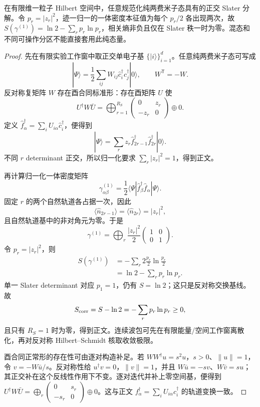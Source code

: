 \begin{theorem}
在有限维一粒子 Hilbert 空间中，任意规范化纯两费米子态具有的正交 Slater 分解。令 $p_r=|z_r|^2$，迹一归一的一体密度本征值为每个 $p_r/2$ 各出现两次，故 $S(\gamma^{(1)})=\ln2-\sum_rp_r\ln p_r$，相关熵非负且仅在 Slater 秩一时为零。混态和不同可操作分区不能直接套用此纯态量。
\end{theorem}
\begin{proof}
先在有限实验工作窗中取正交单电子基 $\{|i\rangle\}_{i=1}^{d}$。任意纯两费米子态可写成
\[
|\Psi\rangle
=\frac12\sum_{ij}W_{ij}\hat c_i^\dagger\hat c_j^\dagger|0\rangle,
\qquad W^{\mathsf T}=-W.
\]
反对称复矩阵 $W$ 存在酉合同标准形：存在酉矩阵 $U$ 使
\[
U^\dagger W\bar U
=\bigoplus_{r=1}^{R_S}
\begin{pmatrix}0&z_r\\-z_r&0\end{pmatrix}\oplus0.
\]
定义 $\hat f_\alpha^\dagger=\sum_iU_{i\alpha}\hat c_i^\dagger$，便得到
\[
|\Psi\rangle
=\sum_rz_r\hat f_{2r-1}^\dagger\hat f_{2r}^\dagger|0\rangle.
\]
不同 $r$ determinant 正交，所以归一化要求 $\sum_r|z_r|^2=1$，得到正文。

再计算归一化一体密度矩阵
\[
\gamma^{(1)}_{\alpha\beta}
=\frac12\langle\Psi|\hat f_\beta^\dagger\hat f_\alpha|\Psi\rangle.
\]
固定 $r$ 的两个自然轨道各占据一次，因此
\[
\langle\hat n_{2r-1}\rangle
=\langle\hat n_{2r}\rangle
=|z_r|^2,
\]
且自然轨道基中的非对角元为零。于是
\[
\gamma^{(1)}
=\bigoplus_r\frac{|z_r|^2}{2}
\begin{pmatrix}1&0\\0&1\end{pmatrix}.
\]
令 $p_r=|z_r|^2$，则
\begin{align*}
S(\gamma^{(1)})
&=-\sum_r2\frac{p_r}{2}\ln\frac{p_r}{2}\\
&=\ln2-\sum_rp_r\ln p_r.
\end{align*}
单一 Slater determinant 对应 $p_1=1$，仍有 $S=\ln2$；这只是反对称交换基线。故
\[
S_{\rm corr}=S-\ln2=-\sum_rp_r\ln p_r\ge0,
\]
且只有 $R_S=1$ 时为零，得到正文。连续波包可先在有限能量/空间工作窗离散化，再对反对称 Hilbert--Schmidt 核取收敛极限。

酉合同正常形的存在性可由逐对构造补足。若 $WW^\dagger u=s^2u$，$s>0$、$\|u\|=1$，令 $v=-W\bar u/s$。反对称性给 $u^\dagger v=0$，$\|v\|=1$，并且 $W\bar u=-sv$、$W\bar v=su$；其正交补在这个反线性作用下不变。逐对迭代并补上零空间基，便得到 $U^\dagger W\bar U=\bigoplus_r\left(\begin{smallmatrix}0&s_r\\-s_r&0\end{smallmatrix}\right)\oplus0$。这与正文 $f_\alpha^\dagger=\sum_iU_{i\alpha}c_i^\dagger$ 的轨道变换一致。
\end{proof}


